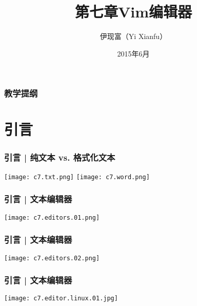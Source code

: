 



\title[Vim]{第七章\quad Vim编辑器}
\author[Yixf]{伊现富（Yi Xianfu）}
\date{2015年6月}


\begin{frame}
  \titlepage
\end{frame}

\begin{frame}[plain,label=current]
  \frametitle{教学提纲}
  \setcounter{tocdepth}{3}
  \begin{multicols}{2}
    \tableofcontents
  \end{multicols}
\end{frame}


\section{引言}
\begin{frame}
  \frametitle{引言 | 纯文本 vs. 格式化文本}
  \begin{center}
    \texttt{[image: c7.txt.png]}
    \vspace*{0.1cm}
    \texttt{[image: c7.word.png]}
  \end{center}
\end{frame}

\begin{frame}
  \frametitle{引言 | 文本编辑器}
  \begin{center}
    \texttt{[image: c7.editors.01.png]}
  \end{center}
\end{frame}

\begin{frame}
  \frametitle{引言 | 文本编辑器}
  \begin{center}
    \texttt{[image: c7.editors.02.png]}
  \end{center}
\end{frame}

\begin{frame}
  \frametitle{引言 | 文本编辑器}
  \begin{center}
    \texttt{[image: c7.editor.linux.01.jpg]}
  \end{center}
\end{frame}

